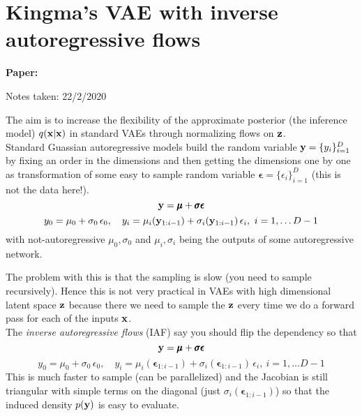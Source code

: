 \clearpage

\section{Kingma's VAE with inverse autoregressive flows}\label{sec:iaf}

\begin{notebox}
\textbf{Paper: } 

\hfill Notes taken: 22/2/2020 
\end{notebox}

\begin{notebox}
\tldr 
The aim is to increase the flexibility of the approximate posterior (the inference model) $q(\mathbf{x} \vert \mathbf{x})$ in standard VAEs through normalizing flows on $\mathbf{z}$. \\

Standard Guassian autoregressive models build the random variable $\mathbf{y} = \{y_i\}_{i=1}^D$ by fixing an order in the dimensions and then getting the dimensions one by one as transformation of some easy to sample random variable $\pmb{\epsilon} = \{\epsilon_i\}_{i=1}^D$ (this is not the data here!).
\begin{equation}
\mathbf{y} = \pmb{\mu} + \pmb{\sigma} \pmb{\epsilon}
\end{equation}
\begin{equation}
y_0 = \mu_0 + \sigma_0 \, \epsilon_0, \quad y_i = \mu_i(\mathbf{y}_{1:i-1}) + \sigma_i(\mathbf{y}_{1:i-1}) \, \epsilon_i, \ i=1, \ldots D-1
\end{equation}
with not-autoregressive $\mu_0, \sigma_0$ and $\mu_i, \sigma_i$ being the outputs of some autoregressive network.

The problem with this is that the sampling is slow (you need to sample recursively). Hence this is not very practical in VAEs with high dimensional latent space $\mathbf{z}$ because there we need to sample the $\mathbf{z}$ every time we do a forward pass for each of the inputs $\mathbf{x}$. \\

The \emph{inverse autoregressive flows} (IAF) say you should flip the dependency so that
\begin{equation}
\mathbf{y} = \pmb{\mu} + \pmb{\sigma} \pmb{\epsilon}
\end{equation}
\begin{equation}
y_0 = \mu_0 + \sigma_0 \, \epsilon_0, \quad y_i = \mu_i(\pmb{\epsilon}_{1:i-1}) + \sigma_i(\pmb{\epsilon}_{1:i-1}) \, \epsilon_i, \ i=1, \ldots D-1
\end{equation}
This is much faster to sample (can be parallelized) and the Jacobian is still triangular with simple terms on the diagonal (just $\sigma_i(\pmb{\epsilon}_{1:i-1})$) so that the induced density $p(\mathbf{y})$ is easy to evaluate.
\end{notebox}

